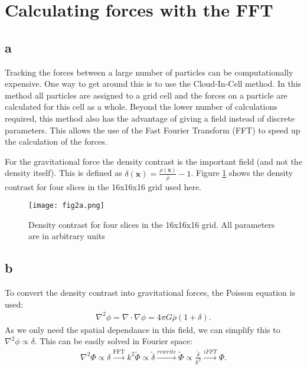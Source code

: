 \section{Calculating forces with the FFT}



\subsection*{a}
Tracking the forces between a large number of particles can be computationally expensive.
One way to get around this is to use the Cloud-In-Cell method.
In this method all particles are assigned to a grid cell and the forces on a particle are calculated for this cell as a whole.
Beyond the lower number of calculations required, this method also has the advantage of giving a field instead of discrete parameters.
This allows the use of the Fast Fourier Transform (FFT) to speed up the calculation of the forces.

For the gravitational force the density contrast is the important field (and not the density itself).
This is defined as $\delta(\mathbf{x}) = \frac{\rho(\mathbf{x})}{\bar{\rho}} - 1$.
Figure \ref{fig:density_contrast} shows the density contrast for four slices in the 16x16x16 grid used here.
\begin{figure}
    \centering
    \texttt{[image: fig2a.png]}
    \caption{Density contrast for four slices in the 16x16x16 grid. All parameters are in arbitrary units}
    \label{fig:density_contrast}
\end{figure}





\subsection*{b}
To convert the density contrast into gravitational forces, the Poisson equation is used:
\begin{align}
    \nabla^2 \phi = \nabla \cdot \nabla \phi = 4 \pi G \bar{\rho} (1 + \delta).
\end{align}
As we only need the spatial dependance in this field, we can simplify this to $\nabla^2 \phi \propto \delta$.
This can be easily solved in Fourier space:
\begin{align}
    \nabla^2 \Phi \propto \delta \xrightarrow{\text{FFT}} k^2 \tilde{\Phi} \propto \tilde{\delta} \xrightarrow{rewrite} \tilde{\Phi} \propto \frac{\tilde{\delta}}{k^2}
    \xrightarrow{iFFT} \Phi.    
\end{align}

